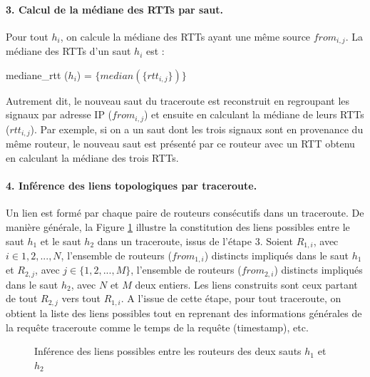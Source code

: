 \paragraph{3. Calcul de la médiane des RTTs par saut.} 
Pour tout $ h_i $,  on calcule la médiane des RTTs ayant une même source $from_{i,j}$.  La médiane des RTTs d'un saut $h_i$ est  :

mediane\_rtt ($h_i$) =  $\{median(\{rtt_{i, j}  \})\}$

Autrement dit, le nouveau saut du traceroute est reconstruit en regroupant les signaux par adresse IP ($ from_{i, j} $) et ensuite en calculant la médiane de leurs RTTs ($rtt_{i,j}$). Par exemple, si on a un saut dont les trois signaux sont en provenance du même routeur, le nouveau saut est présenté par ce routeur avec un RTT obtenu en calculant la médiane des trois RTTs.


\paragraph{4. Inférence des liens topologiques par traceroute.} Un lien  est formé par chaque paire de routeurs consécutifs dans un traceroute. De manière générale, la Figure \ref{fig:link-inference_} illustre la constitution des liens possibles entre le saut $h_1$ et le saut $h_2$  dans un traceroute, issus de l'étape $3$. Soient  $R_{1,i}$, avec $i \in {1,2, ...,N}$,  l'ensemble de routeurs ($from_{1,i}$) distincts impliqués dans le saut $h_1$ et $R_{2,j}$, avec $j \in \{1,2, ..., M\}$, l'ensemble  de routeurs ($from_{2,i}$) distincts impliqués dans le saut $h_2$, avec $ N $ et $ M $ deux entiers. Les liens  construits sont ceux partant de tout $R_{2,j}$ vers tout $R_{1,i}$. A l'issue de cette étape, pour tout traceroute, on obtient la liste des liens possibles tout en reprenant des informations générales de la requête traceroute comme le temps de la requête (timestamp), etc.
\begin{figure}[H]
	\centering
	\captionsetup{justification=centering}
	\resizebox{0.4\textwidth}{!}{
		
	}
	\caption{Inférence des liens possibles entre les routeurs des deux sauts $h_{1}$ et $h_{2}$}
	\label{fig:link-inference_}
\end{figure}
